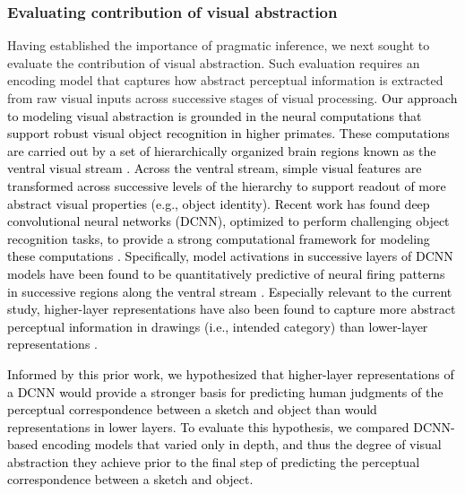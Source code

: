 \documentclass{svjour3}
\newcommand{\revised}[1]{\textcolor{Black}{#1}}
\begin{document}
\subsubsection*{Evaluating contribution of visual abstraction}

Having established the importance of pragmatic inference, we next sought to evaluate the contribution of visual abstraction.
Such evaluation requires an encoding model that captures how abstract perceptual information is extracted from raw visual inputs across successive stages of visual processing. 
\revised{Our approach to modeling visual abstraction is grounded in the neural computations that support robust visual object recognition in higher primates. These computations are carried out by a set of hierarchically organized brain regions known as the ventral visual stream \citep*{malach2002topography,rolls2001functions}. Across the ventral stream, simple visual features are transformed across successive levels of the hierarchy to support readout of more abstract visual properties (e.g., object identity). Recent work has found deep convolutional neural networks (DCNN), optimized to perform challenging object recognition tasks, to provide a strong computational framework for modeling these computations \citep*{yamins2014performance,gucclu2015deep}. Specifically, model activations in successive layers of DCNN models have been found to be quantitatively predictive of neural firing patterns in successive regions along the ventral stream \citep*{yamins2014performance}. Especially relevant to the current study, higher-layer representations have also been found to capture more abstract perceptual information in drawings (i.e., intended category) than lower-layer representations \citep*{FanCommon2018}.}

\revised{Informed by this prior work, we hypothesized that higher-layer representations of a DCNN would provide a stronger basis for predicting human judgments of the perceptual correspondence between a sketch and object than would representations in lower layers.}
\revised{To evaluate this hypothesis, we compared DCNN-based encoding models that varied only in depth, and thus the degree of visual abstraction they achieve prior to the final step of predicting the perceptual correspondence between a sketch and object.}
\end{document}
